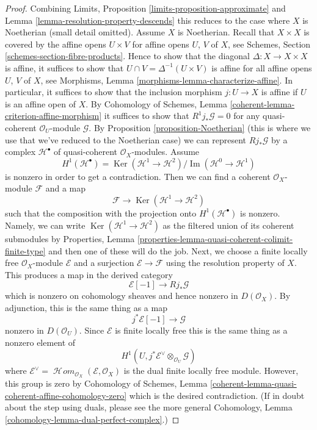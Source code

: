 \documentclass{stacks-project}
\theoremstyle{plain}
\theoremstyle{definition}
\theoremstyle{remark}
\numberwithin{equation}{subsection}
\def\SheafHom{\mathop{\mathcal{H}\!\mathit{om}}\nolimits}
\def\Ker{\mathop{\mathrm{Ker}}}
\def\Im{\mathop{\mathrm{Im}}}
\begin{document}
\begin{proof}
Combining Limits, Proposition \ref{limits-proposition-approximate}
and Lemma \ref{lemma-resolution-property-descends}
this reduces to the case where $X$ is Noetherian (small detail omitted).
Assume $X$ is Noetherian.
Recall that $X \times X$ is covered by the affine opens
$U \times V$ for affine opens $U$, $V$ of $X$, see
Schemes, Section \ref{schemes-section-fibre-products}.
Hence to show that the diagonal $\Delta : X \to X \times X$
is affine, it suffices to show that $U \cap V = \Delta^{-1}(U \times V)$
is affine for all affine opens $U$, $V$ of $X$, see
Morphisms, Lemma \ref{morphisms-lemma-characterize-affine}.
In particular, it suffices to show that the inclusion morphism
$j : U \to X$ is affine if $U$ is an affine open of $X$.
By Cohomology of Schemes, Lemma \ref{coherent-lemma-criterion-affine-morphism}
it suffices to show that $R^1j_*\mathcal{G} = 0$ for any
quasi-coherent $\mathcal{O}_U$-module $\mathcal{G}$.
By Proposition \ref{proposition-Noetherian} (this is where we use
that we've reduced to the Noetherian case)
we can represent $Rj_*\mathcal{G}$ by a complex
$\mathcal{H}^\bullet$ of quasi-coherent $\mathcal{O}_X$-modules.
Assume
$$
H^1(\mathcal{H}^\bullet) =
\Ker(\mathcal{H}^1 \to \mathcal{H}^2)/\Im(\mathcal{H}^0 \to \mathcal{H}^1)
$$
is nonzero in order to get a contradiction. Then we can find a coherent
$\mathcal{O}_X$-module $\mathcal{F}$ and a map
$$
\mathcal{F} \longrightarrow
\Ker(\mathcal{H}^1 \to \mathcal{H}^2)
$$
such that the composition with the projection onto $H^1(\mathcal{H}^\bullet)$
is nonzero. Namely, we can write $\Ker(\mathcal{H}^1 \to \mathcal{H}^2)$
as the filtered union of its coherent submodules by
Properties, Lemma \ref{properties-lemma-quasi-coherent-colimit-finite-type}
and then one of these will do the job.
Next, we choose a finite locally free $\mathcal{O}_X$-module
$\mathcal{E}$ and a surjection $\mathcal{E} \to \mathcal{F}$ using
the resolution property of $X$.
This produces a map in the derived category
$$
\mathcal{E}[-1] \longrightarrow Rj_*\mathcal{G}
$$
which is nonzero on cohomology sheaves and hence nonzero in $D(\mathcal{O}_X)$.
By adjunction, this is the same thing as a map
$$
j^*\mathcal{E}[-1] \to \mathcal{G}
$$
nonzero in $D(\mathcal{O}_U)$. Since $\mathcal{E}$ is finite locally
free this is the same thing as a nonzero element of
$$
H^1(U, j^*\mathcal{E}^\vee \otimes_{\mathcal{O}_U} \mathcal{G})
$$
where
$\mathcal{E}^\vee = \SheafHom_{\mathcal{O}_X}(\mathcal{E}, \mathcal{O}_X)$
is the dual finite locally free module. However, this group is zero by
Cohomology of Schemes, Lemma
\ref{coherent-lemma-quasi-coherent-affine-cohomology-zero}
which is the desired contradiction.
(If in doubt about the step using duals, please see the more general
Cohomology, Lemma \ref{cohomology-lemma-dual-perfect-complex}.)
\end{proof}
\end{document}
